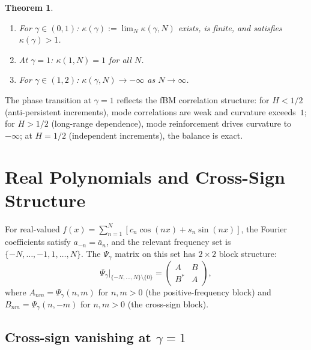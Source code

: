 \documentclass[11pt,a4paper]{article}
\theoremstyle{plain}
\newtheorem{theorem}{Theorem}[section]
\theoremstyle{definition}
\theoremstyle{remark}
\begin{document}
\begin{theorem}\label{thm:phase-transition}
\begin{enumerate}[label=(\roman*)]
\item For $\gamma \in (0,1)$: $\kappa(\gamma) := \lim_N \kappa(\gamma,N)$
  exists, is finite, and satisfies $\kappa(\gamma) > 1$.
\item At $\gamma = 1$: $\kappa(1,N) = 1$ for all $N$.
\item For $\gamma \in (1,2)$: $\kappa(\gamma,N) \to -\infty$ as
  $N \to \infty$.
\end{enumerate}
\end{theorem}

The phase transition at $\gamma = 1$ reflects the fBM correlation
structure: for $H < 1/2$ (anti-persistent increments), mode
correlations are weak and curvature exceeds~$1$; for $H > 1/2$
(long-range dependence), mode reinforcement drives curvature
to $-\infty$; at $H = 1/2$ (independent increments), the balance
is exact.


\section{Real Polynomials and Cross-Sign Structure}\label{sec:real}

For real-valued $f(x) = \sum_{n=1}^N [c_n\cos(nx) + s_n\sin(nx)]$,
the Fourier coefficients satisfy $a_{-n} = \bar{a}_n$, and the relevant
frequency set is $\{-N,\ldots,-1,1,\ldots,N\}$. The $\Psi_\gamma$ matrix
on this set has $2 \times 2$ block structure:
\begin{equation}\label{eq:block}
  \Psi_\gamma\Big|_{\{-N,\ldots,N\} \setminus \{0\}}
  = \begin{pmatrix} A & B \\ B^* & A \end{pmatrix},
\end{equation}
where $A_{nm} = \Psi_\gamma(n,m)$ for $n,m > 0$ (the positive-frequency
block) and $B_{nm} = \Psi_\gamma(n,-m)$ for $n,m > 0$ (the cross-sign
block).


\subsection{Cross-sign vanishing at $\gamma = 1$}\label{sec:cross-sign}
\end{document}
